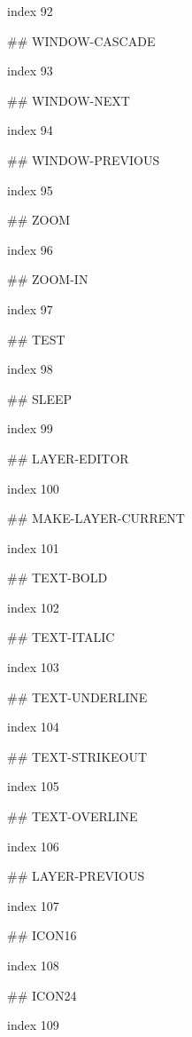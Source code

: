 index 92



## WINDOW-CASCADE

index 93



## WINDOW-NEXT

index 94



## WINDOW-PREVIOUS

index 95



## ZOOM

 index 96



## ZOOM-IN

index 97



## TEST

 index 98



## SLEEP

index 99



## LAYER-EDITOR

index 100



## MAKE-LAYER-CURRENT

index 101



## TEXT-BOLD

index 102



## TEXT-ITALIC

index 103



## TEXT-UNDERLINE

index 104



## TEXT-STRIKEOUT

index 105



## TEXT-OVERLINE

index 106



## LAYER-PREVIOUS

index 107



## ICON16

index 108



## ICON24

index 109



